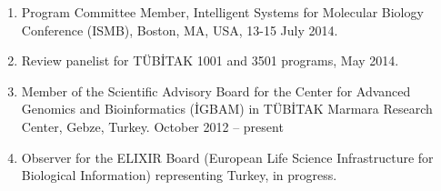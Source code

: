 \begin{enumerate}
\item
  Program Committee Member, Intelligent Systems for Molecular Biology Conference (ISMB), Boston, MA, USA, 13-15 July 2014.
\item Review panelist for  TÜBİTAK 1001 and 3501 programs, May 2014.
\item Member of the Scientific Advisory Board for the Center for Advanced Genomics and Bioinformatics (İGBAM) in TÜBİTAK Marmara Research Center, Gebze, Turkey. October 2012 – present
\item Observer for the ELIXIR Board (European Life Science Infrastructure for Biological Information)  representing Turkey, in progress.
\end{enumerate}
